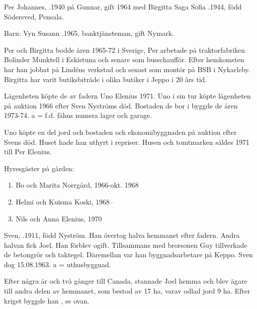 Per Johannes, .1940 på Gunnar, gift 1964 med Birgitta Saga Sofia .1944, född Södersved, Pensala.

Barn: Vyn Susann .1965, banktjänsteman, gift Nymark.

Per och Birgitta bodde åren 1965-72 i Sverige, Per arbetade på traktorfabriken Bolinder Munktell i Eskistuna och senare som busschaufför. Efter hemkomsten har han jobbat på Lindéns verkstad och senast som montör på BSB i Nykarleby. Birgitta har varit butiksbiträde i olika butiker i Jeppo i 20 års tid.

Lägenheten köpte de av fadern Uno Elenius 1971. Uno i sin tur köpte lägenheten på auktion 1966 efter Sven Nyströms död. Bostaden de bor i byggde de åren 1973-74.  a = f.d. fähus numera lager och garage.





Uno köpte en del jord och bostaden och ekonomibyggnaden på auktion efter Svens död. Huset hade han uthyrt i repriser. Husen och tomtmarken såldes 1971 till Per Elenius.

Hyresgäster på gården:
\begin{enumerate}
  \item Bo och Marita Norrgård, 1966-okt. 1968
  \item Helmi och Kuisma Koski, 1968--
  \item Nils och Anna  Elenius, 1970
\end{enumerate}



Sven, .1911, född Nyström. Han övertog halva hemmanet efter fadern. Andra halvan fick Joel. Han förblev ogift. Tillsammans med brorsonen Guy tillverkade de betongrör och taktegel. Däremellan var han byggnadsarbetare på Keppo. Sven dog 15.08.1963. a = uthusbyggnad.\jhvspace{}


Efter några år och två gånger till Canada, stannade Joel hemma och blev ägare till andra delen av hemmanet, som bestod av 17 ha, varav odlad jord 9 ha. Efter kriget byggde han , se ovan.





